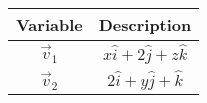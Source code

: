 \begin{tabular}[12pt]{ |c| c|}
    \hline
    \textbf{Variable} & \textbf{Description}\\ 
    \hline
    $\vec{v}_1$ & $x\hat{i}+2\hat{j}+z\hat{k}$\\
    \hline
    $\vec{v}_2$ & $2\hat{i}+y\hat{j}+\hat{k}$\\
    \hline
    \end{tabular}
